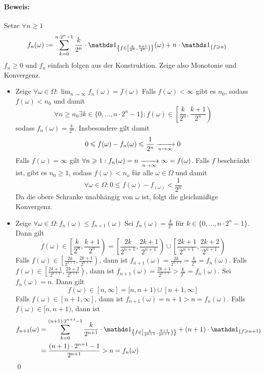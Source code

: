  \paragraph{Beweis:}Setze $\forall n\geq1$
 $$f_n(\omega):=\sum_{k=0}^{n\cdot2^n-1}\dfrac{k}{2^n}\cdot\ind{\left\{f\in\left[\frac{k}{2^n},\frac{k+1}{2^n}\right)\right\}}(\omega)+n\cdot\ind{\{f\geq n\}}$$
 $f_n\geq 0$ und $f_n$ einfach folgen aus der Konstruktion. Zeige also Monotonie und Konvergenz.
 \begin{itemize}
     \item Zeige $\forall\omega\in\Omega:\lim_{n\to\infty}f_n(\omega)=f(\omega)$\newline
        Falls $f(\omega)<\infty$ gibt es $n_0$, sodass $f(\omega)<n_0$ und damit 
        $$\forall n\geq n_0\exists k\in\{0,\hdots, n\cdot2^n-1\}:f(\omega)\in\left[\frac{k}{2^n},\frac{k+1}{2^n}\right)$$
        sodass $f_n(\omega)=\frac{k}{2^n}$. Insbesondere gilt damit
        $$0\leq f(\omega)-f_n(\omega)\leq\frac{1}{2^n}\nto{}{n\to\infty}0$$
        Falls $f(\omega)=\infty$ gilt $\forall n\geq1:f_n(\omega)=n\nto{}{n\to\infty}\infty=f(\omega)$.
        Falls $f$ beschr\"ankt ist, gibt es $n_0\geq1$, sodass $f(\omega)<n_o$ f\"ur alle $\omega\in\Omega$ und damit 
        $$\forall\omega\in\Omega:0\leq f(\omega)-f_(\omega)<\frac{1}{2^n}$$
        Da die obere Schranke unabh\"angig von $\omega$ ist, folgt die gleichm\"a\ss{}ige Konvergenz. 
        \item Zeige $\forall\omega\in\Omega:f_n(\omega)\leq f_{n+1}(\omega)$\newline
        Sei $f_n(\omega)=\frac{k}{2^n}$ f\"ur $k\in\{0,\hdots,n\cdot2^n-1\}$. Dann gilt
        $$f(\omega)\in\left[\frac{k}{2^n},\frac{k+1}{2^n}\right)=\left[\frac{2k}{2^{n+1}},\frac{2k+1}{2^{n+1}}\right)\cup\left[\frac{2k+1}{2^{n+1}},\frac{2k+2}{2^{n+1}}\right)$$
        Falls $f(\omega)\in \left[\frac{2k}{2^{n+1}},\frac{2k+1}{2^{n+1}}\right)$, dann ist $f_{n+1}(\omega)=\frac{2k}{2^{n+1}}=\frac{k}{2^n}=f_n(\omega)$. \newline
        Falls $f(\omega)\in\left[\frac{2k+1}{2^{n+1}},\frac{2k+2}{2^{n+1}}\right)$, dann ist $f_{n+1}(\omega)=\frac{2k+1}{2^{n+1}}>\frac{k}{2^n}=f_n(\omega)$.\newline\newline
        Sei $f_n(\omega)=n$. Dann gilt 
        $$f(\omega)\in [n,\infty]=[n,n+1)\cup[n+1,\infty]$$
        Falls $f(\omega)\in[n+1,\infty]$, dann ist $f_{n+1}(\omega)=n+1>n=f_n(\omega)$.\newline
        Falls $f(\omega)\in[n,n+1)$, dann ist 
        \begin{align*}
            f_{n+1}(\omega)&=\sum_{k=0}^{(n+1)\cdot2^{n+1}-1}\dfrac{k}{2^{n+1}}\cdot\ind{\left\{f\in\left[\frac{k}{2^{n+1}},\frac{k+1}{2^{n+1}}\right)\right\}}+(n+1)\cdot\ind{\{f\geq n+1\}}\\&=\dfrac{(n+1)\cdot2^{n+1}-1}{2^{n+1}}>n=f_n(\omega)\
        \end{align*}
        \qed
 \end{itemize}